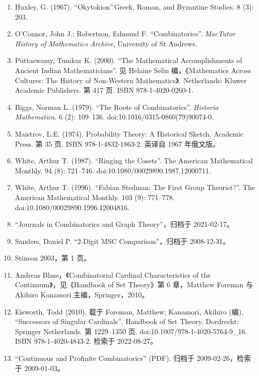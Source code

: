 \begin{enumerate}
  \item Huxley, G. (1967). “Okytokion”.Greek, Roman, and Byzantine Studies. 8 (3): 203.  
  \item O'Connor, John J.; Robertson, Edmund F. “Combinatorics”. \textit{MacTutor History of Mathematics Archive}, University of St Andrews.  
  \item Puttaswamy, Tumkur K. (2000). “The Mathematical Accomplishments of Ancient Indian Mathematicians”. 见 Helaine Selin 编，《Mathematics Across Cultures: The History of Non-Western Mathematics》. Netherlands: Kluwer Academic Publishers. 第 417 页. ISBN 978-1-4020-0260-1.  
  \item Biggs, Norman L. (1979). “The Roots of Combinatorics”. \textit{Historia Mathematica}. 6 (2): 109–136. doi:10.1016/0315-0860(79)90074-0.  
  \item Maistrov, L.E. (1974). Probability Theory: A Historical Sketch. Academic Press. 第 35 页. ISBN 978-1-4832-1863-2. 英译自 1967 年俄文版。  
  \item White, Arthur T. (1987). “Ringing the Cosets”. The American Mathematical Monthly. 94 (8): 721–746. doi:10.1080/00029890.1987.12000711.  
  \item White, Arthur T. (1996). “Fabian Stedman: The First Group Theorist?”. The American Mathematical Monthly. 103 (9): 771–778. doi:10.1080/00029890.1996.12004816.  
  \item “Journals in Combinatorics and Graph Theory”，归档于 2021-02-17。  
  \item Sanders, Daniel P. “2-Digit MSC Comparison”，归档于 2008-12-31。  
  \item Stinson 2003，第 1 页。  
  \item Andreas Blass，《Combinatorial Cardinal Characteristics of the Continuum》，见《Handbook of Set Theory》第 6 章，Matthew Foreman 与 Akihiro Kanamori 主编，Springer，2010。  
  \item Eisworth, Todd (2010). 载于 Foreman, Matthew; Kanamori, Akihiro (编), “Successors of Singular Cardinals”, Handbook of Set Theory. Dordrecht: Springer Netherlands. 第 1229–1350 页. doi:10.1007/978-1-4020-5764-9\_16. ISBN 978-1-4020-4843-2. 检索于 2022-08-27。  
  \item “Continuous and Profinite Combinatorics” (PDF). 归档于 2009-02-26，检索于 2009-01-03。  
\end{enumerate}
